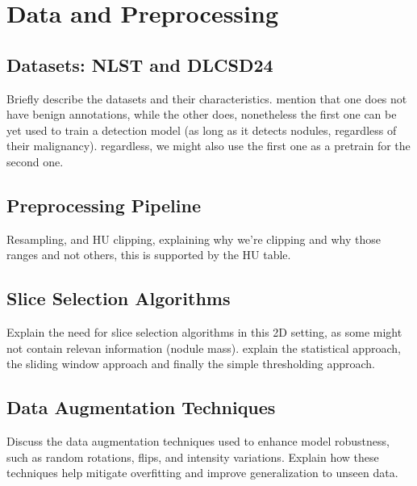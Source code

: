 \chapter{Data and Preprocessing}
\section{Datasets: NLST and DLCSD24}
Briefly describe the datasets and their characteristics. mention that one does not have benign annotations, while the other does, nonetheless the first one can be yet used to train a detection model (as long as it detects nodules, regardless of their malignancy). regardless, we might also use the first one as a pretrain for the second one.

\section{Preprocessing Pipeline}
Resampling, and HU clipping, explaining why we're clipping and why those ranges and not others, this is supported by the HU table.

\section{Slice Selection Algorithms}
Explain the need for slice selection algorithms in this 2D setting, as some might not contain relevan information (nodule mass). explain the statistical approach, the sliding window approach and finally the simple thresholding approach.

\section{Data Augmentation Techniques}
Discuss the data augmentation techniques used to enhance model robustness, such as random rotations, flips, and intensity variations. Explain how these techniques help mitigate overfitting and improve generalization to unseen data.